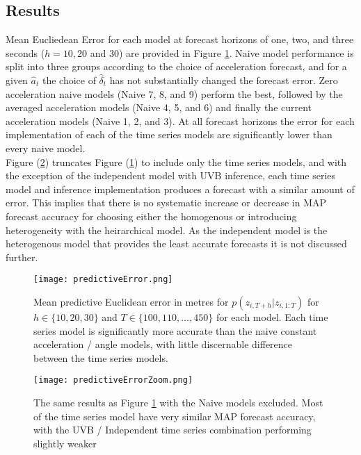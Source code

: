 \documentclass[12pt,a4paper]{article}\usepackage[]{graphicx}\usepackage[]{color}
\begin{document}
\subsection{Results}
\label{subsec:Results}

Mean Eucliedean Error for each model at forecast horizons of one, two, and three seconds ($h = 10, 20$ and $30$) are provided in Figure \ref{fig:PredError}. Naive model performance is split into three groups according to the choice of acceleration forecast, and for a given $\hat{a}_t$ the choice of $\hat{\delta}_t$ has not substantially changed the forecast error. Zero acceleration naive models (Naive 7, 8, and 9) perform the best, followed by the averaged acceleration models (Naive 4, 5, and 6) and finally the current acceleration models (Naive 1, 2, and 3). At all forecast horizons the error for each implementation of each of the time series models are significantly lower than every naive model.
\\

Figure (\ref{fig:PredErrorZ}) truncates Figure (\ref{fig:PredError}) to include only the time series models, and with the exception of the independent model with UVB inference, each time series model and inference implementation produces a forecast with a similar amount of error. This implies that there is no systematic increase or decrease in MAP forecast accuracy for choosing either the homogenous or introducing heterogeneity with the heirarchical model. As the independent model is the heterogenous model that provides the least accurate forecasts it is not discussed further.
\\

\begin{figure}[ht]
\centering
\texttt{[image: predictiveError.png]}
\caption{Mean predictive Euclidean error in metres for $p(z_{i, T+h} | z_{i, 1:T})$ for $h \in \{10, 20, 30\}$ and $T \in \{100, 110, \dots, 450\}$ for each model. Each time series model is significantly more accurate than the naive constant acceleration / angle models, with little discernable difference between the time series models.}
\label{fig:PredError}
\end{figure}

\begin{figure}[ht]
\centering
\texttt{[image: predictiveErrorZoom.png]}
\caption{The same results as Figure \ref{fig:PredError} with the Naive models excluded. Most of the time series model have very similar MAP forecast accuracy, with the UVB / Independent time series combination performing slightly weaker}
\label{fig:PredErrorZ}
\end{figure}
\end{document}
